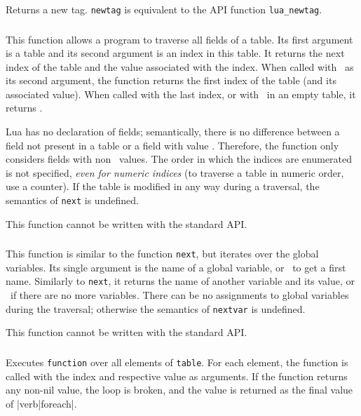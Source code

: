 \subsubsection*{\ff {}}\label{pdf-newtag}
Returns a new tag.
\verb|newtag| is equivalent to the API function \verb|lua_newtag|.

\subsubsection*{\ff {}}
This function allows a program to traverse all fields of a table.
Its first argument is a table and its second argument
is an index in this table.
It returns the next index of the table and the
value associated with the index.
When called with \nil\ as its second argument,
the function returns the first index
of the table (and its associated value).
When called with the last index,
or with \nil\ in an empty table,
it returns \nil.

Lua has no declaration of fields;
semantically, there is no difference between a
field not present in a table or a field with value \nil.
Therefore, the function only considers fields with non \nil\ values.
The order in which the indices are enumerated is not specified,
\emph{even for numeric indices}
(to traverse a table in numeric order, use a counter).
If the table is modified in any way during a traversal,
the semantics of \verb|next| is undefined.

This function cannot be written with the standard API.

\subsubsection*{\ff {}}
This function is similar to the function \verb|next|,
but iterates over the global variables.
Its single argument is the name of a global variable,
or \nil\ to get a first name.
Similarly to \verb|next|, it returns the name of another variable
and its value,
or \nil\ if there are no more variables.
There can be no assignments to global variables during the traversal;
otherwise the semantics of \verb|nextvar| is undefined.

This function cannot be written with the standard API.

\subsubsection*{\ff {}}
Executes \verb|function| over all elements of \verb|table|.
For each element, the function is called with the index and
respective value as arguments.
If the function returns any non-nil value,
the loop is broken, and the value is returned
as the final value of |verb|foreach|.

